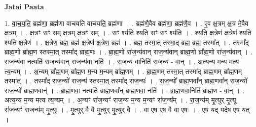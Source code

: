\documentclass[17pt]{extarticle}
\begin{document}
\textbf{Jatai Paata} \newline

1. वा॒च॒य॒ति॒ ब्रह्म॑णा॒ ब्रह्म॑णा वाचयति वाचयति॒ ब्रह्म॑णा । . ब्रह्म॑णै॒वैव ब्रह्म॑णा॒ ब्रह्म॑णै॒व । . ए॒व क्ष॒त्रम् क्ष॒त्र मे॒वैव क्ष॒त्रम् । . क्ष॒त्रꣳ सꣳ सम् क्ष॒त्रम् क्ष॒त्रꣳ सम् । . सꣳ श्य॑ति श्यति॒ सꣳ सꣳ श्य॑ति । . श्य॒ति॒ क्ष॒त्रेण॑ क्ष॒त्रेण॑ श्यति श्यति क्ष॒त्रेण॑ । . क्ष॒त्रेण॒ ब्रह्म॒ ब्रह्म॑ क्ष॒त्रेण॑ क्ष॒त्रेण॒ ब्रह्म॑ । . ब्रह्म॒ तस्मा॒त् तस्मा॒द् ब्रह्म॒ ब्रह्म॒ तस्मा᳚त् । . तस्मा᳚द् ब्राह्म॒णो ब्रा᳚ह्म॒ण स्तस्मा॒त् तस्मा᳚द् ब्राह्म॒णः । . ब्रा॒ह्म॒णो रा॑ज॒न्य॑वान् राज॒न्य॑वान् ब्राह्म॒णो ब्रा᳚ह्म॒णो रा॑ज॒न्य॑वान् । . रा॒ज॒न्य॑वा॒ नत्यति॑ राज॒न्य॑वान् राज॒न्य॑वा॒ नति॑ । . रा॒ज॒न्य॑ वा॒निति॑ राज॒न्य॑ - वा॒न् । . अत्य॒न्य म॒न्य मत्य त्य॒न्यम् । . अ॒न्यम् ब्रा᳚ह्म॒णम् ब्रा᳚ह्म॒ण म॒न्य म॒न्यम् ब्रा᳚ह्म॒णम् । . ब्रा॒ह्म॒णम् तस्मा॒त् तस्मा᳚द् ब्राह्म॒णम् ब्रा᳚ह्म॒णम् तस्मा᳚त् । . तस्मा᳚द् राज॒न्यो॑ राज॒न्य॑ स्तस्मा॒त् तस्मा᳚द् राज॒न्यः॑ । . रा॒ज॒न्यो᳚ ब्राह्म॒णवा᳚न् ब्राह्म॒णवा᳚न् राज॒न्यो॑ राज॒न्यो᳚ ब्राह्म॒णवान्॑ । . ब्रा॒ह्म॒णवा॒ नत्यति॑ ब्राह्म॒णवा᳚न् ब्राह्म॒णवा॒ नति॑ । . ब्रा॒ह्म॒णवा॒निति॑ ब्राह्म॒ण - वा॒न् । . अत्य॒न्य म॒न्य मत्य त्य॒न्यम् । . अ॒न्यꣳ रा॑ज॒न्यꣳ॑ राज॒न्य॑ म॒न्य म॒न्यꣳ रा॑ज॒न्य᳚म् । . रा॒ज॒न्य॑म् मृ॒त्युर् मृ॒त्यू रा॑ज॒न्यꣳ॑ राज॒न्य॑म् मृ॒त्युः । . मृ॒त्युर् वै वै मृ॒त्युर् मृ॒त्युर् वै । . वा ए॒ष ए॒ष वै वा ए॒षः । . ए॒ष यद् यदे॒ष ए॒ष यत् । \newline
\end{document}
